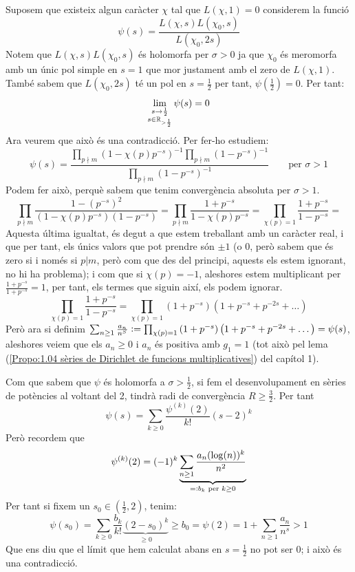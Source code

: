 \begin{pf}
    Suposem que existeix algun caràcter $\chi$ tal que $L(\chi,1)=0$ considerem la funció
    \[
    \psi(s)=\frac{L(\chi,s)L(\chi_0,s)}{L(\chi_0,2s)}
    \]
    Notem que $L(\chi,s)L(\chi_0,s)$ és holomorfa per $\sigma>0$ ja que $\chi_0$ és meromorfa amb un únic pol simple en $s=1$ que mor justament amb el zero de $L(\chi,1)$. També sabem que $L(\chi_0,2s)$ té un pol en $s=\frac{1}{2}$ per tant, $\psi(\frac{1}{2})=0$. Per tant:
    \[
    \lim_{\substack{s\to\frac{1}{2}\\s\in\mathbb R_{>\frac{1}{2}}}}\psi(s)=0
    \]
    Ara veurem que això és una contradicció. Per fer-ho estudiem:
    \[
    \psi(s)=\frac{\prod_{p\nmid m}\left(1-\chi(p)p^{-s}\right)^{-1}\prod_{p\nmid m}\left(1-p^{-s}\right)^{-1}}{\prod_{p\nmid m}\left(1-p^{-s}\right)^{-1}}\qquad \text{per }\sigma>1
    \]
    Podem fer això, perquè sabem que tenim convergència absoluta per $\sigma>1$.
    \[
    \prod_{p\nmid m}\frac{1-\left(p^{-s}\right)^2}{\left(1-\chi(p)p^{-s}\right)\left(1-p^{-s}\right)}=
    \prod_{p\nmid m}\frac{1+p^{-s}}{1-\chi(p)p^{-s}}=
    \prod_{\chi(p)=1}\frac{1+p^{-s}}{1-p^{-s}}=
    \]
    Aquesta última igualtat, és degut a que estem treballant amb un caràcter real, i que per tant, els únics valors que pot prendre són $\pm1$ (o 0, però sabem que és zero si i només si $p|m$, però com que des del principi, aquests els estem ignorant, no hi ha problema); i com que si $\chi(p)=-1$, aleshores estem multiplicant per $\frac{1+p^{-s}}{1+p^{-s}}=1$, per tant, els termes que siguin així, els podem ignorar.
    \[
    \prod_{\chi(p)=1}\frac{1+p^{-s}}{1-p^{-s}}=
    \prod_{\chi(p)=1}\left(1+p^{-s}\right)\left(1+p^{-s}+p^{-2s}+\dots\right)
    \]
    Però ara si definim $\sum_{n\geq1}\frac{a_n}{n^S}\vcentcolon=\prod_{\chi(p)=1}\left(1+p^{-s}\right)\left(1+p^{-s}+p^{-2s}+\dots\right)=\psi(s)$, aleshores veiem que els $a_n\geq0$ i $a_n$ és positiva amb $g_1=1$ (tot això pel lema (\ref{Propo:1.04 sèries de Dirichlet de funcions multiplicatives}) del capítol 1).\par

    Com que sabem que $\psi$ és holomorfa a $\sigma>\frac{1}{2}$, si fem el desenvolupament en sèries de potències al voltant del 2, tindrà radi de convergència $R\geq\frac{3}{2}$. Per tant
    \[
    \psi(s)=\sum_{k\geq0}\frac{\psi^{(k)}(2)}{k!}(s-2)^k
    \]
    Però recordem que 
    \[\psi^{(k)}(2)=(-1)^k\underbrace{\sum_{n\geq1}\frac{a_n(\log(n))^k}{n^2}}_{=\vcentcolon b_k\text{ per }k\geq0}\]
    Per tant si fixem un $s_0\in (\frac{1}{2},2)$, tenim:
    \[
    \psi(s_0)=\sum_{k\geq0}\frac{b_k}{k!}\underbrace{(2-s_0)^k}_{\geq0}\geq b_0=\psi(2)=1+\sum_{n\geq1}\frac{a_n}{n^s}>1
    \]
    Que ens diu que el límit que hem calculat abans en $s=\frac{1}{2}$ no pot ser 0; i això és una contradicció.
\end{pf}